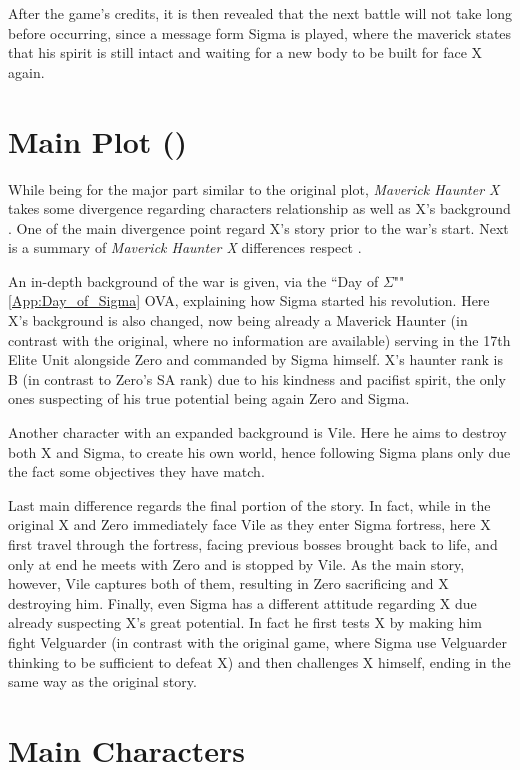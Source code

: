 After the game's credits, it is then revealed that the next battle will not take long before occurring, since a message form Sigma is played, where the maverick states that his spirit is still intact and waiting for a new body to be built for face X again.

\section{Main Plot (\mhx)}
While being for the major part similar to the original plot, \textit{Maverick Haunter X} takes some divergence regarding characters relationship as well as X's background \cite{wiki:MM_MHX}. One of the main divergence point regard X's story prior to the war's start. Next is a summary of \textit{Maverick Haunter X} differences respect \x.

An in-depth background of the war is given, via the ``Day of $\Sigma$""\ref{App:Day_of_Sigma} OVA, explaining how Sigma started his revolution. Here X's background is also changed, now being already a Maverick Haunter (in contrast with the original, where no information are available) serving in the 17th Elite Unit alongside Zero and commanded by Sigma himself. X's haunter rank is B (in contrast to Zero's SA rank) due to his kindness and pacifist spirit, the only ones suspecting of his true potential being again Zero and Sigma. 

Another character with an expanded background is Vile. Here he aims to destroy both X and Sigma, to create his own world, hence following Sigma plans only due the fact some objectives they have match.

Last main difference regards the final portion of the story\cite{wiki:MM_MHX_script}. In fact, while in the original X and Zero immediately face Vile as they enter Sigma fortress, here X first travel through the fortress, facing previous bosses brought back to life, and only at end he meets with Zero and is stopped by Vile. As the main story, however, Vile captures both of them, resulting in Zero sacrificing and X destroying him. Finally, even Sigma has a different attitude regarding X due already suspecting X's great potential. In fact he first tests X by making him fight Velguarder (in contrast with the original game, where Sigma use Velguarder thinking to be sufficient to defeat X) and then challenges X himself, ending in the same way as the original story.	

\section{Main Characters}

